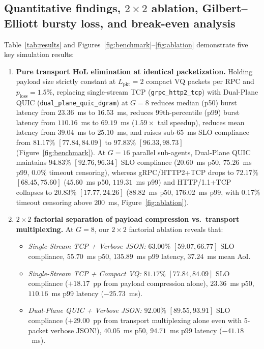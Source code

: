 \documentclass[11pt]{article}
\begin{document}
\subsection{Quantitative findings, $2\times 2$ ablation, Gilbert--Elliott bursty loss, and break-even analysis}

Table~\ref{tab:results} and Figures~\ref{fig:benchmark}--\ref{fig:ablation} demonstrate five key simulation results:
\begin{enumerate}
  \item \textbf{Pure transport HoL elimination at identical packetization.} Holding payload size strictly constant at $L_{\mathrm{pkt}} = 2$ compact VQ packets per RPC and $p_{\mathrm{loss}} = 1.5\%$, replacing single-stream TCP (\texttt{grpc\_\linebreak[0]http2\_\linebreak[0]tcp}) with Dual-Plane QUIC (\texttt{dual\_\linebreak[0]plane\_\linebreak[0]quic\_\linebreak[0]dgram}) at $G=8$ reduces median (p50) burst latency from $23.36$~ms to $16.53$~ms, reduces 99th-percentile (p99) burst latency from $110.16$~ms to $69.19$~ms ($1.59\times$ tail speedup), reduces mean latency from $39.04$~ms to $25.10$~ms, and raises sub-65~ms SLO compliance from $81.17\%$ $[77.84, 84.09]$ to $97.83\%$ $[96.33, 98.73]$ (Figure~\ref{fig:benchmark}). At $G=16$ parallel sub-agents, Dual-Plane QUIC maintains $94.83\%$ $[92.76, 96.34]$ SLO compliance ($20.60$~ms p50, $75.26$~ms p99, $0.0\%$ timeout censoring), whereas gRPC/HTTP2+TCP drops to $72.17\%$ $[68.45, 75.60]$ ($45.60$~ms p50, $119.31$~ms p99) and HTTP/1.1+TCP collapses to $20.83\%$ $[17.77, 24.26]$ ($88.82$~ms p50, $176.02$~ms p99, with $0.17\%$ timeout censoring above $200$~ms, Figure~\ref{fig:ablation}).
  \item \textbf{$2\times 2$ factorial separation of payload compression vs.\ transport multiplexing.} At $G=8$, our $2\times 2$ factorial ablation reveals that:
  \begin{itemize}
    \item \emph{Single-Stream TCP + Verbose JSON:} $63.00\%$ $[59.07, 66.77]$ SLO compliance, $55.70$~ms p50, $135.89$~ms p99 latency, $37.24$~ms mean AoI.
    \item \emph{Single-Stream TCP + Compact VQ:} $81.17\%$ $[77.84, 84.09]$ SLO compliance ($+18.17$~pp from payload compression alone), $23.36$~ms p50, $110.16$~ms p99 latency ($-25.73$~ms).
    \item \emph{Dual-Plane QUIC + Verbose JSON:} $92.00\%$ $[89.55, 93.91]$ SLO compliance ($+29.00$~pp from transport multiplexing alone even with 5-packet verbose JSON!), $40.05$~ms p50, $94.71$~ms p99 latency ($-41.18$~ms).

\end{itemize}
\end{enumerate}
\end{document}
